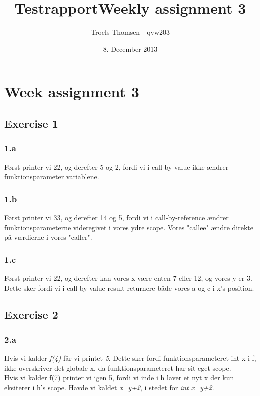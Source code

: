 \documentclass[12pt]{article}
\title{Testrapport}
\begin{document}
\title{Weekly assignment 3}
\date{8. December 2013}
\author{Troels Thomsen - qvw203}

\clearpage
\maketitle
\thispagestyle{empty}

\pagebreak

\section{Week assignment 3} 

\subsection{Exercise 1}

\subsubsection{1.a}
Først printer vi 22, og derefter 5 og 2, fordi vi i call-by-value ikke ændrer funktionsparameter variablene.  

\subsubsection{1.b}
Først printer vi 33, og derefter 14 og 5, fordi vi i call-by-reference ændrer funktionsparameterne videregivet i vores ydre scope. Vores "callee" ændre direkte på værdierne i vores "caller".

\subsubsection{1.c}
Først printer vi 22, og derefter kan vores x være enten 7 eller 12, og vores y er 3. Dette sker fordi vi i call-by-value-result returnere både vores a og c i x's position.

\pagebreak

\subsection{Exercise 2}

\subsubsection{2.a}
Hvis vi kalder \textit{f(4)} får vi printet \textit{5}. Dette sker fordi funktionsparameteret int x i f, ikke overskriver det globale x, da funktionsparameteret har sit eget scope.\\
Hvis vi kalder f(7) printer vi igen 5, fordi vi inde i h laver et nyt x der kun eksiterer i h's scope. Havde vi kaldet \textit{x=y+2}, i stedet for \textit{int x=y+2}.
\end{document}
